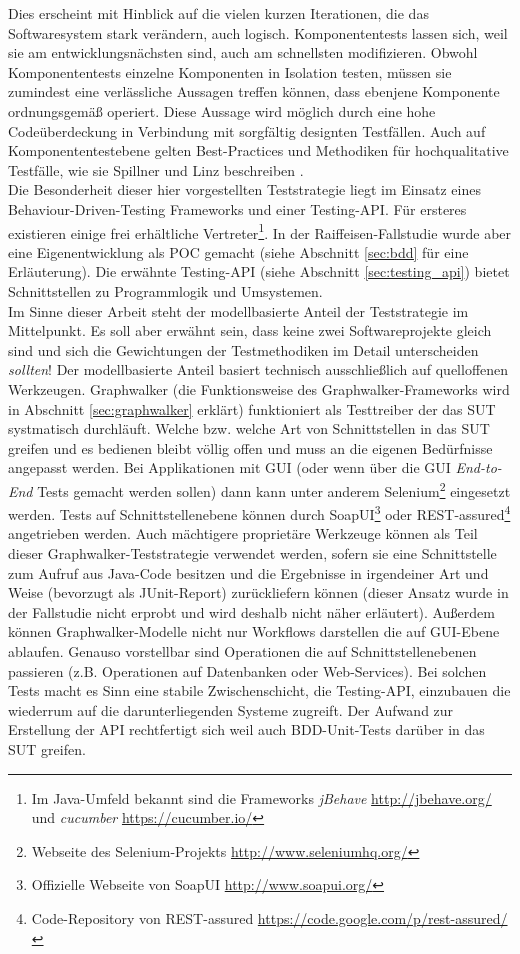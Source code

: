 Dies erscheint mit Hinblick auf die vielen kurzen Iterationen, die das Softwaresystem stark verändern, auch logisch. Komponententests lassen sich, weil sie am entwicklungsnächsten sind, auch am schnellsten modifizieren. Obwohl Komponententests einzelne Komponenten in Isolation testen, müssen sie zumindest eine verlässliche Aussagen treffen können, dass ebenjene Komponente ordnungsgemäß operiert. Diese Aussage wird möglich durch eine hohe Codeüberdeckung in Verbindung mit sorgfältig designten Testfällen. Auch auf Komponententestebene gelten Best-Practices und Methodiken für hochqualitative Testfälle, wie sie Spillner und Linz beschreiben \cite{spillner_software_2014}.\\
Die Besonderheit dieser hier vorgestellten Teststrategie liegt im Einsatz eines Behaviour-Driven-Testing \cite{chelimsky_rspec_2010} Frameworks und einer Testing-API. Für ersteres existieren einige frei erhältliche Vertreter\footnote{Im Java-Umfeld bekannt sind die Frameworks \textit{jBehave} \url{http://jbehave.org/} und \textit{cucumber} \url{https://cucumber.io/}}. In der Raiffeisen-Fallstudie wurde aber eine Eigenentwicklung als \Gls{POC} gemacht (siehe Abschnitt \ref{sec:bdd} für eine Erläuterung). Die erwähnte Testing-API (siehe Abschnitt \ref{sec:testing_api}) bietet Schnittstellen zu Programmlogik und Umsystemen.\\
Im Sinne dieser Arbeit steht der modellbasierte Anteil der Teststrategie im Mittelpunkt. Es soll aber erwähnt sein, dass keine zwei Softwareprojekte gleich sind und sich die Gewichtungen der Testmethodiken im Detail unterscheiden \textit{sollten}! Der modellbasierte Anteil basiert technisch ausschließlich auf quelloffenen Werkzeugen. Graphwalker (die Funktionsweise des Graphwalker-Frameworks wird in Abschnitt \ref{sec:graphwalker} erklärt) funktioniert als Testtreiber der das \Gls{SUT} systmatisch durchläuft. Welche bzw. welche Art von Schnittstellen in das \Gls{SUT} greifen und es bedienen bleibt völlig offen und muss an die eigenen Bedürfnisse angepasst werden. Bei Applikationen mit GUI (oder wenn über die GUI \textit{End-to-End} Tests gemacht werden sollen) dann kann unter anderem  Selenium\footnote{Webseite des Selenium-Projekts \url{http://www.seleniumhq.org/}} eingesetzt werden. Tests auf Schnittstellenebene können durch SoapUI\footnote{ Offizielle Webseite von SoapUI \url{http://www.soapui.org/}} oder REST-assured\footnote{Code-Repository von REST-assured \url{https://code.google.com/p/rest-assured/}} angetrieben werden. Auch mächtigere proprietäre Werkzeuge können als Teil dieser Graphwalker-Teststrategie verwendet werden, sofern sie eine Schnittstelle zum Aufruf aus Java-Code besitzen und die Ergebnisse in irgendeiner Art und Weise (bevorzugt als JUnit-Report) zurückliefern können (dieser Ansatz wurde in der Fallstudie nicht erprobt und wird deshalb nicht näher erläutert). Außerdem können Graphwalker-Modelle nicht nur Workflows darstellen die auf GUI-Ebene ablaufen. Genauso vorstellbar sind Operationen die auf Schnittstellenebenen passieren (z.B. Operationen auf Datenbanken oder Web-Services). Bei solchen Tests macht es Sinn eine stabile Zwischenschicht, die Testing-API, einzubauen die wiederrum auf die darunterliegenden Systeme zugreift. Der Aufwand zur Erstellung der API rechtfertigt sich weil auch \Gls{BDD}-Unit-Tests darüber in das \Gls{SUT} greifen.
